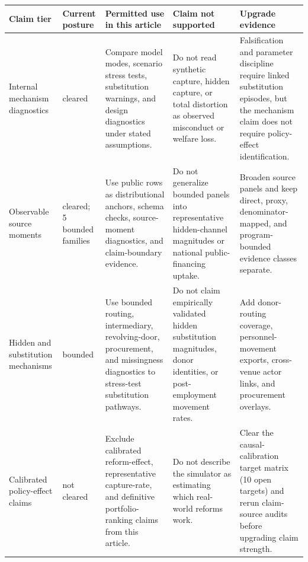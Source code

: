 \begingroup
\begin{center}
\begin{minipage}{\textwidth}
\centering
\scriptsize
\setlength{\tabcolsep}{3pt}
\begin{tabular}{>{\raggedright\arraybackslash}p{}>{\raggedright\arraybackslash}p{}>{\raggedright\arraybackslash}p{}>{\raggedright\arraybackslash}p{}>{\raggedright\arraybackslash}p{}}
\toprule
Claim tier & Current posture & Permitted use in this article & Claim not supported & Upgrade evidence \\
\midrule
Internal mechanism diagnostics & cleared & Compare model modes, scenario stress tests, substitution warnings, and design diagnostics under stated assumptions. & Do not read synthetic capture, hidden capture, or total distortion as observed misconduct or welfare loss. & Falsification and parameter discipline require linked substitution episodes, but the mechanism claim does not require policy-effect identification. \\
Observable source moments & 4 cleared; 5 bounded families & Use public rows as distributional anchors, schema checks, source-moment diagnostics, and claim-boundary evidence. & Do not generalize bounded panels into representative hidden-channel magnitudes or national public-financing uptake. & Broaden source panels and keep direct, proxy, denominator-mapped, and program-bounded evidence classes separate. \\
Hidden and substitution mechanisms & bounded & Use bounded routing, intermediary, revolving-door, procurement, and missingness diagnostics to stress-test substitution pathways. & Do not claim empirically validated hidden substitution magnitudes, donor identities, or post-employment movement rates. & Add donor-routing coverage, personnel-movement exports, cross-venue actor links, and procurement overlays. \\
Calibrated policy-effect claims & not cleared & Exclude calibrated reform-effect, representative capture-rate, and definitive portfolio-ranking claims from this article. & Do not describe the simulator as estimating which real-world reforms work. & Clear the causal-calibration target matrix (10 open targets) and rerun claim-source audits before upgrading claim strength. \\
\bottomrule
\end{tabular}
\par\smallskip
\captionsetup{hypcap=false}
\label{tab:claim-ladder}
\end{minipage}
\end{center}
\endgroup
